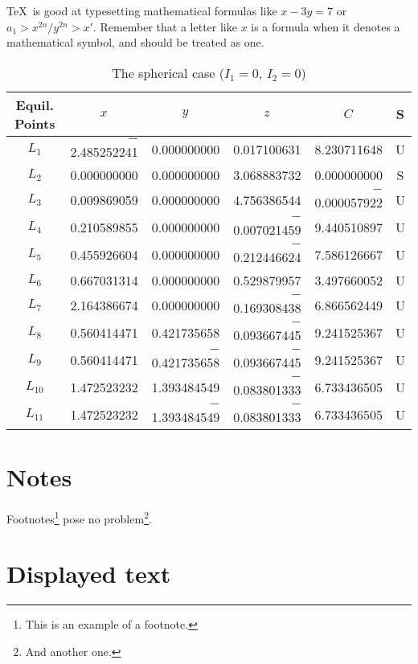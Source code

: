 \documentclass[amsa]{ipart}
\begin{document}
\TeX\ is good at typesetting mathematical formulas like
       \( x-3y = 7 \)
or
       \( a_{1} > x^{2n} / y^{2n} > x' \).
Remember that a letter like       $x$
is a formula when it denotes a mathematical symbol, and should
be treated as one.

\begin{table*}
\caption{The spherical case ($I_1=0$, $I_2=0$)}\label{sphericcase}
\begin{tabular*}{\textwidth}{@{\extracolsep{\fill}}crrrrc}
\hline
\hline
 Equil. Points & \multicolumn{1}{c}{$x$} & \multicolumn{1}{c}{$y$} & \multicolumn{1}{c}{$z$} & \multicolumn{1}{c}{$C$} &
S \\
\hline
$L_1$ & $-$2.485252241 & 0.000000000 & 0.017100631 & 8.230711648 & U \\
$L_2$ &    0.000000000 & 0.000000000 & 3.068883732 & 0.000000000 & S \\
$L_3$ &    0.009869059 & 0.000000000 & 4.756386544 & $-$0.000057922 & U \\
$L_4$ &    0.210589855 & 0.000000000 & $-$0.007021459 & 9.440510897 & U \\
$L_5$ &    0.455926604 & 0.000000000 & $-$0.212446624 & 7.586126667 & U \\
$L_6$ &    0.667031314 & 0.000000000 & 0.529879957 & 3.497660052 & U \\
$L_7$ &    2.164386674 & 0.000000000 & $-$0.169308438 & 6.866562449 & U \\
$L_8$ &    0.560414471 & 0.421735658 & $-$0.093667445 & 9.241525367 & U \\
$L_9$ &    0.560414471 & $-$0.421735658 & $-$0.093667445 & 9.241525367 & U\\
$L_{10}$ & 1.472523232 & 1.393484549 & $-$0.083801333 & 6.733436505 & U \\
$L_{11}$ & 1.472523232 & $-$1.393484549 & $-$0.083801333 & 6.733436505 & U
\\ \hline
\end{tabular*}
\end{table*}


\section{Notes}
Footnotes\footnote{This is an example of a footnote.}
pose no problem\footnote{And another one.}.

\section{Displayed text}
\end{document}
